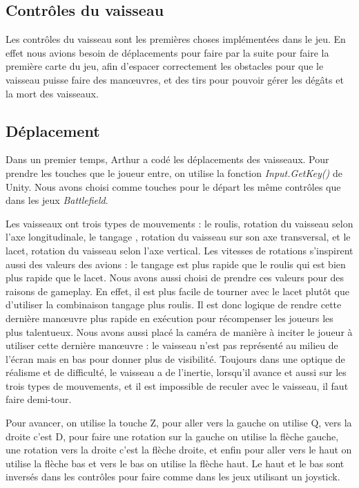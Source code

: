 \documentclass[12pt, titlepage]{article}
\begin{document}
\begin{spacing}{1.5}
\newpage
\section{Contrôles du vaisseau}

Les contrôles du vaisseau sont les premières choses implémentées dans le jeu. En effet nous avions besoin de déplacements pour faire par la suite pour faire la première carte du jeu, afin d'espacer correctement les obstacles pour que le vaisseau puisse faire des man\oe uvres, et des tirs pour pouvoir gérer les dégâts et la mort des vaisseaux.

\subsection{Déplacement}

Dans un premier temps, Arthur a codé les déplacements des vaisseaux. Pour prendre les touches que le joueur entre, on utilise la fonction \textit{Input.GetKey()} de Unity. Nous avons choisi comme touches pour le départ les même contrôles que dans les jeux \textit{Battlefield}.

Les vaisseaux ont trois types de mouvements : le roulis, rotation du vaisseau selon l'axe longitudinale, le tangage , rotation du vaisseau sur son axe transversal, et le lacet, rotation du vaisseau selon l'axe vertical. Les vitesses de rotations s'inspirent aussi des valeurs des avions : le tangage est plus rapide que le roulis qui est bien plus rapide que le lacet. Nous avons aussi choisi de prendre ces valeurs pour des raisons de gameplay. En effet, il est plus facile de tourner avec le lacet plutôt que d'utiliser la combinaison tangage plus roulis. Il est donc logique de rendre cette dernière man\oe uvre plus rapide en exécution pour récompenser les joueurs les plus talentueux. Nous avons aussi placé la caméra de manière à inciter le joueur à utiliser cette dernière man\oe uvre : le vaisseau n'est pas représenté au milieu de l'écran mais en bas pour donner plus de visibilité. Toujours dans une optique de réalisme et de difficulté, le vaisseau a de l'inertie, lorsqu'il avance et aussi sur les trois types de mouvements, et il est impossible de reculer avec le vaisseau, il faut faire demi-tour.

 Pour avancer, on utilise la touche Z, pour aller vers la gauche on utilise Q, vers la droite c'est D, pour faire une rotation sur la gauche on utilise la flèche gauche, une rotation vers la droite c'est la flèche droite, et enfin pour aller vers le haut on utilise la flèche bas et vers le bas on utilise la flèche haut. Le haut et le bas sont inversés dans les contrôles pour faire comme dans les jeux utilisant un joystick.


\end{spacing}
\end{document}
